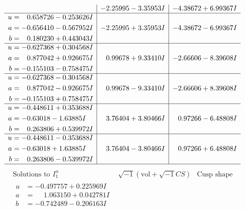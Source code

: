 \documentclass[1p]{elsarticle_modified}
\theoremstyle{definition}
\newcommand{\I}{\sqrt{-1}}
\begin{document}
$$\begin{array}{c|c|c}
 & -2.25995 - 3.35953 I & -4.38672 + 6.99367 I \\ \hline\begin{aligned}
u &= \phantom{-}0.658726 - 0.253626 I \\
a &= -0.656410 - 0.567952 I \\
b &= \phantom{-}0.180230 + 0.443043 I\end{aligned}
 & -2.25995 + 3.35953 I & -4.38672 - 6.99367 I \\ \hline\begin{aligned}
u &= -0.627368 + 0.304568 I \\
a &= \phantom{-}0.877042 + 0.926675 I \\
b &= -0.155103 - 0.758475 I\end{aligned}
 & \phantom{-}0.99678 + 9.33410 I & -2.66606 - 8.39608 I \\ \hline\begin{aligned}
u &= -0.627368 - 0.304568 I \\
a &= \phantom{-}0.877042 - 0.926675 I \\
b &= -0.155103 + 0.758475 I\end{aligned}
 & \phantom{-}0.99678 - 9.33410 I & -2.66606 + 8.39608 I \\ \hline\begin{aligned}
u &= -0.448611 + 0.353688 I \\
a &= -0.63018 - 1.63885 I \\
b &= \phantom{-}0.263806 + 0.539972 I\end{aligned}
 & \phantom{-}3.76404 + 3.80466 I & \phantom{-}0.97266 - 6.48808 I \\ \hline\begin{aligned}
u &= -0.448611 - 0.353688 I \\
a &= -0.63018 + 1.63885 I \\
b &= \phantom{-}0.263806 - 0.539972 I\end{aligned}
 & \phantom{-}3.76404 - 3.80466 I & \phantom{-}0.97266 + 6.48808 I\\
 \hline 
 \end{array}$$\newpage$$\begin{array}{c|c|c}  
\text{Solutions to }I^u_{1}& \I (\text{vol} + \sqrt{-1}CS) & \text{Cusp shape}\\
 \hline 
\begin{aligned}
u &= -0.497757 + 0.225969 I \\
a &= \phantom{-}1.063150 + 0.042781 I \\
b &= -0.742489 - 0.206163 I\end{aligned}

\end{array}$$
\end{document}
